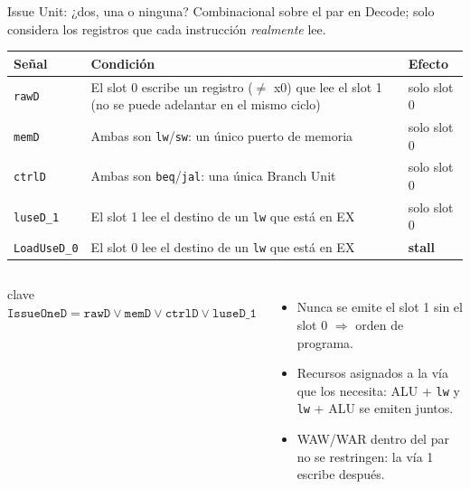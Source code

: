 \documentclass[aspectratio=169,10pt]{beamer}
\newcommand{\sig}[1]{\texttt{#1}}
\newcommand{\clave}[1]{\begin{beamercolorbox}[rounded=true,sep=6pt]{clave}#1\end{beamercolorbox}}
\begin{document}
\begin{frame}{Issue Unit: ¿dos, una o ninguna?}
  \small
  Combinacional sobre el par en Decode; solo considera los registros que cada instrucción \emph{realmente} lee.
  \vspace{0.2cm}

  \begin{tabularx}{\linewidth}{@{}lXl@{}}
    \toprule
    \textbf{Señal} & \textbf{Condición} & \textbf{Efecto}\\
    \midrule
    \sig{rawD} & El slot 0 escribe un registro ($\neq$ x0) que lee el slot 1 (no se puede adelantar en el mismo ciclo) & solo slot 0\\
    \sig{memD} & Ambas son \texttt{lw}/\texttt{sw}: un único puerto de memoria & solo slot 0\\
    \sig{ctrlD} & Ambas son \texttt{beq}/\texttt{jal}: una única Branch Unit & solo slot 0\\
    \sig{luseD\_1} & El slot 1 lee el destino de un \texttt{lw} que está en EX & solo slot 0\\
    \sig{LoadUseD\_0} & El slot 0 lee el destino de un \texttt{lw} que está en EX & \textbf{stall}\\
    \bottomrule
  \end{tabularx}
  \vspace{0.3cm}

  \begin{columns}[T]
    \clave{\centering $\sig{IssueOneD} = \sig{rawD} \lor \sig{memD} \lor \sig{ctrlD} \lor \sig{luseD\_1}$}
    \begin{itemize}\footnotesize
      \item Nunca se emite el slot 1 sin el slot 0 $\Rightarrow$ orden de programa.
      \item Recursos asignados a la vía que los necesita: ALU + \texttt{lw} y \texttt{lw} + ALU se emiten juntos.
      \item WAW/WAR dentro del par no se restringen: la vía 1 escribe después.
    \end{itemize}
  \end{columns}
\end{frame}
\end{document}
